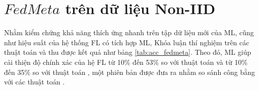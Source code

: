 \begin{table}
    \centering
    \caption{Bảng độ chính xác (\%) của thuật toán FedAvg, FedAvgMeta, FedPerMeta tính trên điểm dữ liệu (dữ liệu IID và Non-IID)}
    \label{tab:fedavg_acc}
\end{table}

\section{$FedMeta$ trên dữ liệu Non-IID}


Nhằm kiểm chứng khả năng thích ứng nhanh trên tập dữ liệu mới của ML, cũng như hiệu suất của hệ thống FL có tích hợp ML, Khóa luận thí nghiệm trên các thuật toán  và thu được kết quả như bảng \ref{tab:acc_fedmeta}. Theo đó, ML giúp cải thiện độ chính xác của hệ FL từ 10\% đến 53\% so với thuật toán  và từ 10\% đến 35\% so với thuật toán , một phiên bản được đưa ra nhằm so sánh công bằng với các thuật toán .

